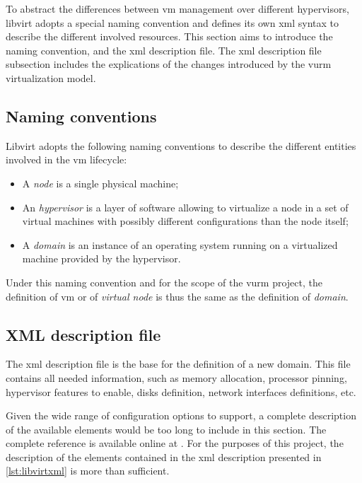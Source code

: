 To abstract the differences between \gls{vm} management over different hypervisors, libvirt adopts a special naming convention and defines its own \gls{xml} syntax to describe the different involved resources. This section aims to introduce the naming convention, and the \gls{xml} description file. The \gls{xml} description file subsection includes the explications of the changes introduced by the \gls{vurm} virtualization model.


\subsection{Naming conventions}

Libvirt adopts the following naming conventions to describe the different entities involved in the \gls{vm} lifecycle:

\begin{itemize}
	\item A \emph{node} is a single physical machine;
	\item An \emph{hypervisor} is a layer of software allowing to virtualize a node in a set of virtual machines with possibly different configurations than the node itself;
	\item A \emph{domain} is an instance of an operating system running on a virtualized machine provided by the hypervisor.
\end{itemize}

Under this naming convention and for the scope of the \gls{vurm} project, the definition of \gls{vm} or of \emph{virtual node} is thus the same as the definition of \emph{domain}.


\subsection{XML description file}

The \gls{xml} description file is the base for the definition of a new domain. This file contains all needed information, such as memory allocation, processor pinning, hypervisor features to enable, disks definition, network interfaces definitions, etc.

Given the wide range of configuration options to support, a complete description of the available elements would be too long to include in this section. The complete reference is available online at \cite{libvirt-domains}. For the purposes of this project, the description of the elements contained in the \gls{xml} description presented in \autoref{lst:libvirtxml} is more than sufficient.

